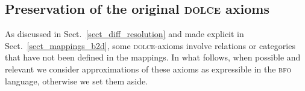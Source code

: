 \documentclass[ao]{iosart2x}
\newcommand{\bdDefLabel}{\textrm{d$_\texttt{bd}$}}
\newcommand{\refbddf}[1]{({\bdDefLabel}\ref{#1})}
\newcommand{\cn}[1]{\mathtt{#1}}
\newcommand{\dolce}{{\textsc{dolce}}}
\newcommand{\bfo}{{\textsc{bfo}}}
\newcommand {\EDdcat} {\textsc{ed}}
\newcommand {\NPEDdcat} {\textsc{nped}}
\newcommand {\PEDdcat} {\textsc{ped}}
\newcommand{\gdcntbcat}{\cn{gdcnt}}
\newcommand{\bfoiof}[1]{{\,::_{#1\:\!}}}
\begin{document}
%

\subsection{Preservation of the original {\dolce} axioms}\label{sect_check_dolce_preservation}

As discussed in Sect.~\ref{sect_diff_resolution} and made explicit in Sect.~\ref{sect_mappings_b2d}, some {\dolce}-axioms involve relations or categories that have not been defined in the mappings. In what follows, when possible and relevant we consider approximations of these axioms as expressible in the {\bfo} language, otherwise we set them aside.
\end{document}
